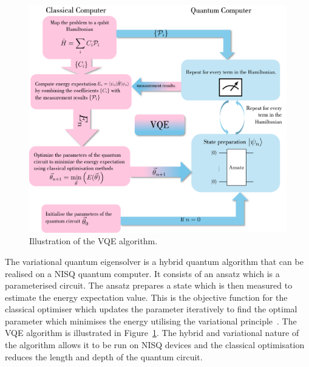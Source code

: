 \begin{figure}[ht]
    \centering
    \includegraphics[width=0.7\linewidth]{image/vqe-illu.png}
    \caption{Illustration of the VQE algorithm.}
    \label{fig:vqe-illu}
\end{figure}

The variational quantum eigensolver is a hybrid quantum algorithm that can be realised on a NISQ quantum computer. It consists of an ansatz which is a parameterised circuit. The ansatz prepares a state which is then measured to estimate the energy expectation value. This is the objective function for the classical optimiser which updates the parameter iteratively to find the optimal parameter which minimises the energy utilising the variational principle~\cite{peruzzo2014}. The VQE algorithm is illustrated in Figure~\ref{fig:vqe-illu}. The hybrid and variational nature of the algorithm allows it to be run on NISQ devices and the classical optimisation reduces the length and depth of the quantum circuit.

